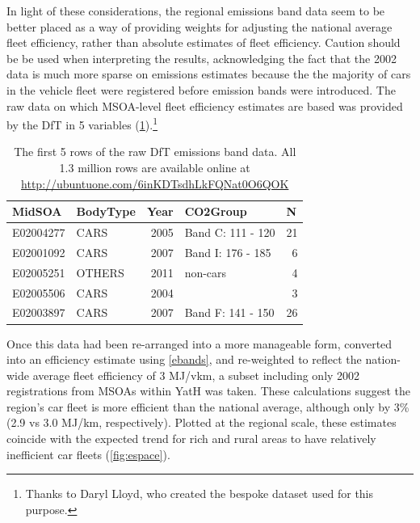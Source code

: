 In light of these considerations, the regional emissions band data seem to be
better placed as a way of providing weights for adjusting the
national average fleet efficiency, rather than absolute estimates of
fleet efficiency. Caution should be be used when interpreting the results,
acknowledging the fact that the 2002 data is much more sparse on
emissions estimates because the the majority of cars in the vehicle fleet
were registered before emission bands were introduced.
The raw
data on which MSOA-level fleet efficiency estimates are based was provided by
the DfT in 5 variables (\cref{tefraw}).\footnote{Thanks to Daryl Lloyd,
who created the bespoke dataset
used for this purpose.
}

\begin{table}[htbp]
\caption[The first 5 rows of the raw DfT emissions band data]
{The first 5 rows of the raw DfT emissions band data. All 1.3 million
rows are available online at \href{http://ubuntuone.com/6inKDTsdhLkFQNat0O6QOK}
{http://ubuntuone.com/6inKDTsdhLkFQNat0O6QOK}}
\begin{center}
\begin{tabular}{llrlr}
\toprule
MidSOA & BodyType & \multicolumn{1}{l}{Year} & CO2Group & \multicolumn{1}{l}{N} \\
\midrule
E02004277 & CARS & 2005 & Band C: 111 - 120 & 21 \\
E02001092 & CARS & 2007 & Band I: 176 - 185 & 6 \\
E02005251 & OTHERS & 2011 & non-cars & 4 \\
E02005506 & CARS & 2004 &  & 3 \\
E02003897 & CARS & 2007 & Band F: 141 - 150 & 26 \\
\bottomrule
\end{tabular} \end{center}
\label{tefraw}
\end{table}

Once this data had been re-arranged into a more manageable form, converted into
an efficiency estimate using \cref{ebands}, and re-weighted to reflect the nation-wide
average fleet efficiency of 3 MJ/vkm,
a subset including only 2002 registrations from MSOAs within
YatH was taken. These calculations suggest the region's car fleet is more
efficient than the national average, although only by 3\% (2.9 vs 3.0 MJ/km, respectively).
Plotted at the regional scale, these estimates coincide with the expected trend for rich
and rural areas to have relatively inefficient car fleets (\cref{fig:espace}).

